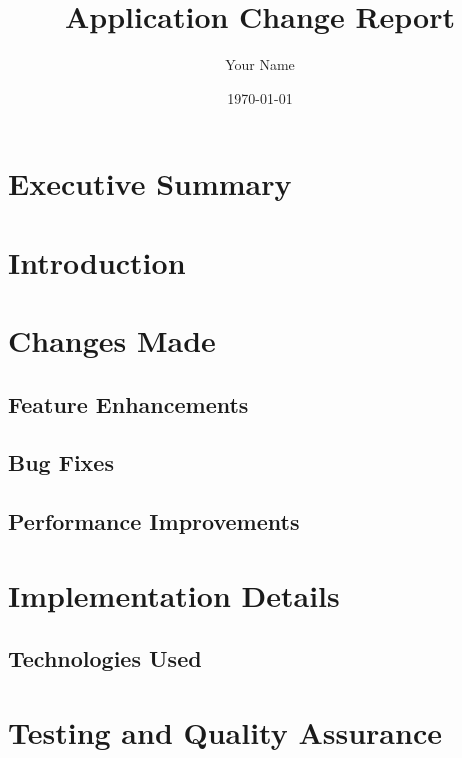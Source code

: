 \documentclass[a4paper,12pt]{article}
\title{Application Change Report}
\author{Your Name}
\date{\today}
\begin{document}
\maketitle

\section*{Executive Summary}

\section{Introduction}

\section{Changes Made}
\subsection{Feature Enhancements}
\subsection{Bug Fixes}
\subsection{Performance Improvements}

\section{Implementation Details}
\subsection{Technologies Used}

\section{Testing and Quality Assurance}
\end{document}
